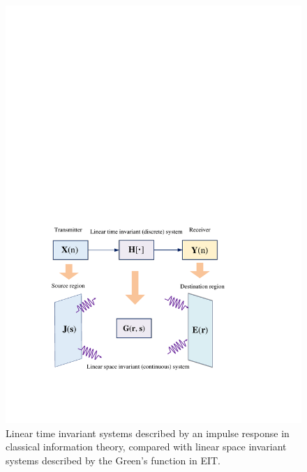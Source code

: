 \documentclass[journal,twocolumn]{IEEEtran}
\begin{document}
\begin{figure}
	\centering 
	\includegraphics[width=0.9\linewidth]{figures/discrete_to_continuous.pdf} 
	\caption{Linear time invariant systems described by an impulse response in classical information theory, compared with linear space invariant systems described by the Green's function in EIT.} 
	\label{fig:Shannon_Marzetta}
\end{figure}

\end{document}

